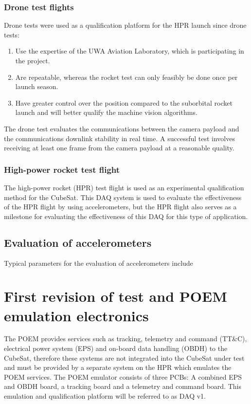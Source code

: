 \documentclass[a4paper,11pt]{article}
\begin{document}
\subsubsection{Drone test flights}

Drone tests were used as a qualification platform for the HPR launch since drone tests:

\begin{enumerate}
  \item Use the expertise of the UWA Aviation Laboratory, which is participating in the project.
  \item Are repeatable, whereas the rocket test can only feasibly be done once per launch season.
  \item Have greater control over the position compared to the suborbital rocket launch and will better qualify the machine vision algorithms.
\end{enumerate}

The drone test evaluates the communications between the camera payload and the communications downlink stability in real time. A successful test involves receiving at least one frame from the camera payload at a reasonable quality.

\subsubsection{High-power rocket test flight}

The high-power rocket (HPR) test flight is used as an experimental qualification method for the CubeSat. This DAQ system is used to evaluate the effectiveness of the HPR flight by using accelerometers, but the HPR flight also serves as a milestone for evaluating the effectiveness of this DAQ for this type of application.

\subsection{Evaluation of accelerometers}

Typical parameters for the evaluation of accelerometers include

\section{First revision of test and POEM emulation electronics}

The POEM provides services such as tracking, telemetry and command (TT\&C), electrical power system (EPS) and on-board data handling (OBDH) to the CubeSat, therefore these systems are not integrated into the CubeSat under test and must be provided by a separate system on the HPR which emulates the POEM services. The POEM emulator consists of three PCBs: A combined EPS and OBDH board, a tracking board and a telemetry and command board. This emulation and qualification platform will be referred to as DAQ v1.
\end{document}
